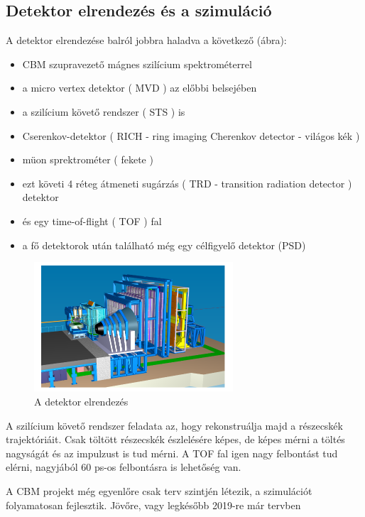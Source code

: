 \documentclass[a4paper,12pt]{article}
\begin{document}
\subsection{ Detektor elrendezés és a szimuláció}
\par A detektor elrendezése balról jobbra haladva a következő (ábra):
\begin{itemize}
	\item CBM szupravezető mágnes szilícium spektrométerrel
	\item a micro vertex detektor ( MVD ) az előbbi belsejében
	\item a szilícium követő rendszer ( STS ) is
	\item Cserenkov-detektor ( RICH - ring imaging Cherenkov detector - világos kék )
	\item müon sprektrométer ( fekete )
	\item ezt követi 4 réteg átmeneti sugárzás ( TRD - transition radiation detector ) detektor
	\item és egy time-of-flight ( TOF ) fal
	\item a fő detektorok után található még  egy célfigyelő detektor (PSD)  
\end{itemize}
\begin{figure}[H]
	\centering
	\includegraphics[width=0.66\textwidth]{cbm_detector.png}
	\caption{ A detektor elrendezés }
\end{figure}
\par A szilícium követő rendszer feladata az, hogy rekonstruálja majd a részecskék trajektóriáit. Csak töltött részecskék észlelésére képes, 
de képes mérni a töltés nagyságát és az impulzust is tud mérni. A TOF fal igen nagy felbontást tud elérni, nagyjából 60 ps-os felbontásra is
lehetőség van.
\vspace{5mm}
\par A CBM projekt még egyenlőre csak terv szintjén létezik, a szimulációt folyamatosan fejlesztik. Jövőre, vagy legkésőbb 2019-re már tervben 
\end{document}
